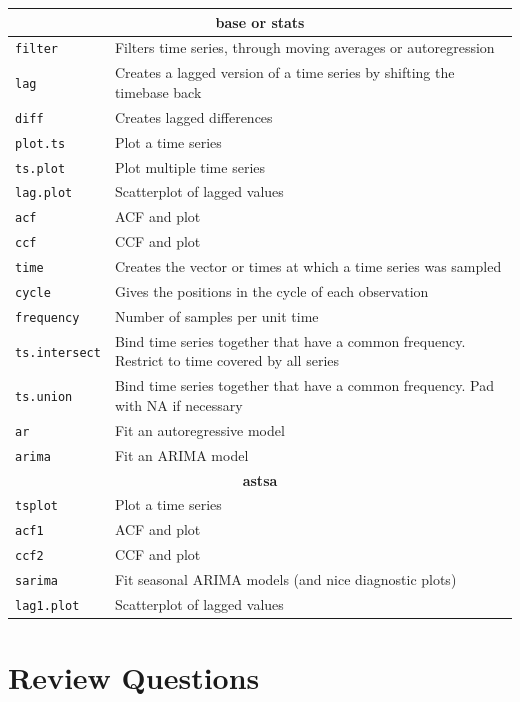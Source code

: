 \renewcommand{\arraystretch}{1.25}
\begin{tabularx}{\textwidth}{l|X} \hline
\multicolumn{2}{c}{\textbf{base or stats}} \\ \hline
\texttt{filter} & Filters time series, through moving averages or autoregression \\
\texttt{lag} & Creates a lagged version of a time series by shifting the timebase back \\
\texttt{diff} & Creates lagged differences \\ 
\texttt{plot.ts} & Plot a time series \\
\texttt{ts.plot} & Plot multiple time series \\
\texttt{lag.plot} & Scatterplot of lagged values \\
\texttt{acf} & ACF and plot \\
\texttt{ccf} & CCF and plot \\ 
\texttt{time} & Creates the vector or times at which a time series was sampled \\
\texttt{cycle} & Gives the positions in the cycle of each observation \\
\texttt{frequency} & Number of samples per unit time \\
\texttt{ts.intersect} & Bind time series together that have a common frequency. Restrict to time covered by all series \\
\texttt{ts.union} & Bind time series together that have a common frequency. Pad with NA if necessary \\ 
\texttt{ar} & Fit an autoregressive model \\ 
\texttt{arima} & Fit an ARIMA model \\ \hline
\multicolumn{2}{c}{\textbf{astsa}} \\ \hline
\texttt{tsplot} & Plot a time series \\
\texttt{acf1} & ACF and plot \\
\texttt{ccf2} & CCF and plot \\
\texttt{sarima} & Fit seasonal ARIMA models (and nice diagnostic plots) \\
\texttt{lag1.plot} & Scatterplot of lagged values \\ \hline
\end{tabularx}

\FloatBarrier
\section{Review Questions}

